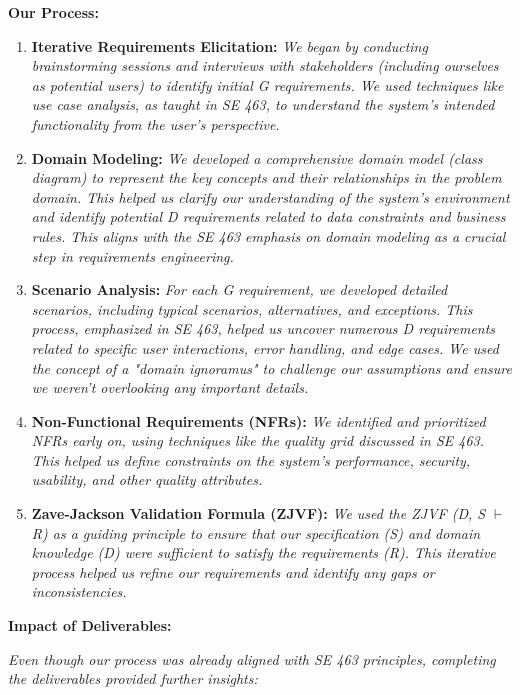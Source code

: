 \documentclass{article}
\begin{document}
\textbf{Our Process:}

\begin{enumerate}
    \item \textbf{Iterative Requirements Elicitation:} \textit{We began by conducting brainstorming sessions and interviews with stakeholders (including ourselves as potential users) to identify initial G requirements. We used techniques like use case analysis, as taught in SE 463, to understand the system's intended functionality from the user's perspective.}

    \item \textbf{Domain Modeling:} \textit{We developed a comprehensive domain model (class diagram) to represent the key concepts and their relationships in the problem domain. This helped us clarify our understanding of the system's environment and identify potential D requirements related to data constraints and business rules. This aligns with the SE 463 emphasis on domain modeling as a crucial step in requirements engineering.}

    \item \textbf{Scenario Analysis:} \textit{For each G requirement, we developed detailed scenarios, including typical scenarios, alternatives, and exceptions. This process, emphasized in SE 463, helped us uncover numerous D requirements related to specific user interactions, error handling, and edge cases. We used the concept of a "domain ignoramus" to challenge our assumptions and ensure we weren't overlooking any important details.}

    \item \textbf{Non-Functional Requirements (NFRs):} \textit{We identified and prioritized NFRs early on, using techniques like the quality grid discussed in SE 463. This helped us define constraints on the system's performance, security, usability, and other quality attributes.}

    \item \textbf{Zave-Jackson Validation Formula (ZJVF):} \textit{We used the ZJVF (D, S $\vdash$ R) as a guiding principle to ensure that our specification (S) and domain knowledge (D) were sufficient to satisfy the requirements (R). This iterative process helped us refine our requirements and identify any gaps or inconsistencies.}
\end{enumerate}

\textbf{Impact of Deliverables:}

\textit{Even though our process was already aligned with SE 463 principles, completing the deliverables provided further insights:}
\end{document}
